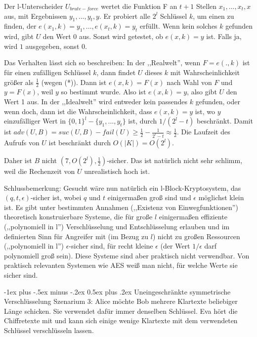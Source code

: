 \documentclass[a4paper]{article}
\makeatletter
\renewcommand{\section}{\@startsection{section}{1}{0mm}%
 {-1ex plus -.5ex minus -.2ex}%
 {0.5ex plus .2ex}%
 {\normalfont\large\bfseries}}
\makeatother
\begin{document}
\begin{multicols}{3}
    Der l-Unterscheider $U_{brute-force}$ wertet die Funktion F an $t+1$ Stellen $x_1,...,x_t,x$ aus, mit Ergebnissen $y_1,...,y_t,y$. Er probiert alle $2^l$ Schlüssel $k$, um einen zu finden, der $e(x_1,k)=y_1 ,...,e(x_t,k) =y_t$ erfüllt. Wenn kein solches $k$ gefunden wird, gibt $U$ den Wert $0$ aus.
    Sonst wird getestet, ob $e(x,k)=y$ ist. Falls ja, wird $1$ ausgegeben, sonst $0$.

    Das Verhalten lässt sich so beschreiben: In der ,,Realwelt'', wenn $F=e(.,k)$ ist für einen zufälligen Schlüssel $k$, dann findet $U$  dieses $k$ mit Wahrscheinlichkeit größer als $\frac{1}{2}$ (wegen (*)). Dann ist $e(x,k) =F(x)$ nach Wahl von $F$ und $y=F(x)$, weil $y$ so bestimmt wurde.
    Also ist $e(x,k) =y$, also gibt $U$ den Wert 1 aus. In der ,,Idealwelt'' wird entweder kein passendes $k$ gefunden, oder wenn doch, dann ist die Wahrscheinlichkeit, dass $e(x,k) =y$ ist, wo $y$ einzufälliger Wert in $\{0,1\}^l-\{y_1,...,y_t\}$ ist, durch $1/(2^l-t)$ beschränkt. Damit ist $adv(U,B) = suc(U,B)-fail(U)\geq \frac{1}{2}-\frac{1}{2^l-t}\approx\frac{1}{2}$.
    Die Laufzeit des Aufrufs von $U$ ist beschränkt durch $O(|K|) =O(2^l)$.

    Daher ist $B$ nicht $(7, O(2^l),\frac{1}{2})$-sicher. Das ist natürlich nicht sehr schlimm, weil die Rechenzeit von $U$ unrealistisch hoch ist.

    Schlussbemerkung: Gesucht wäre nun natürlich ein l-Block-Kryptosystem, das $(q,t,\epsilon)$-sicher ist, wobei $q$ und $t$ einigermaßen groß sind und $\epsilon$ möglichst klein ist. Es gibt unter bestimmten Annahmen (,,Existenz von Einwegfunktionen'') theoretisch konstruierbare Systeme, die für große $l$ einigermaßen effiziente (,,polynomiell in l'') Verschlüsselung und Entschlüsselung erlauben und im definierten Sinn für Angreifer mit (im Bezug zu $l$) nicht zu großen Ressourcen (,,polynomiell in l'') $\epsilon$-sicher sind, für recht kleine $\epsilon$ (der Wert $1/\epsilon$ darf polynomiell groß sein). Diese Systeme sind aber praktisch nicht verwendbar. Von praktisch relevanten Systemen wie AES weiß man nicht, für welche Werte sie sicher sind.

    \section{Uneingeschränkte symmetrische Verschlüsselung}
    Szenarium 3: Alice möchte Bob mehrere Klartexte beliebiger Länge schicken. Sie verwendet dafür immer denselben Schlüssel. Eva hört die Chiffretexte mit und kann sich einige wenige Klartexte mit dem verwendeten Schlüssel verschlüsseln lassen.


\end{multicols}
\end{document}
